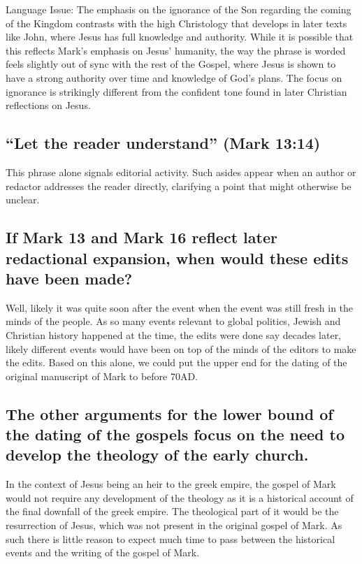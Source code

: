 Language Issue: The emphasis on the ignorance of the Son regarding the coming of the Kingdom contrasts with the high Christology that develops in later texts like John, where Jesus has full knowledge and authority.
While it is possible that this reflects Mark's emphasis on Jesus' humanity, the way the phrase is worded feels slightly out of sync with the rest of the Gospel, where Jesus is shown to have a strong authority over time and knowledge of God's plans.
The focus on ignorance is strikingly different from the confident tone found in later Christian reflections on Jesus.

\subsection{``Let the reader understand'' (Mark 13:14)}\label{subsec:let-the-reader-understand-mark-1314}

This phrase alone signals editorial activity.
Such asides appear when an author or redactor addresses the reader directly, clarifying a point that might otherwise be unclear.

\subsection{If Mark 13 and Mark 16 reflect later redactional expansion, when would these edits have been made?}\label{subsec:now-the-question-is-if-mark-13-and-mark-16-were-added-to-the-gospel-known-to-us-then-when-would-the-edits-have-been-made}

Well, likely it was quite soon after the event when the event was still fresh in the minds of the people.
As so many events relevant to global politics, Jewish and Christian history happened at the time, the edits were done say decades later, likely different events would have been on top of the minds of the editors to make the edits.
Based on this alone, we could put the upper end for the dating of the original manuscript of Mark to before 70AD.

\subsection{The other arguments for the lower bound of the dating of the gospels focus on the need to develop the theology of the early church.}\label{subsec:the-other-arguments-for-the-lower-bound-of-the-dating-of-the-gospels-focus-on-the-need-to-develop-the-theology-of-the-early-church.}

In the context of Jesus being an heir to the greek empire, the gospel of Mark would not require any development of the theology as it is a historical account of the final downfall of the greek empire.
The theological part of it would be the resurrection of Jesus, which was not present in the original gospel of Mark.
As such there is little reason to expect much time to pass between the historical events and the writing of the gospel of Mark.

